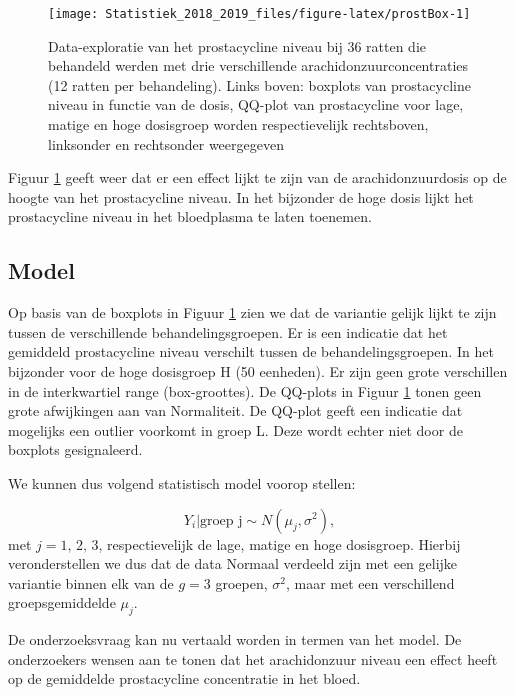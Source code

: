 \documentclass[12pt,dutch,coursenotes]{book}
\theoremstyle{definition}
\theoremstyle{definition}
\theoremstyle{definition}
\theoremstyle{remark}
\begin{document}
\begin{figure}

{\centering \texttt{[image: Statistiek\_2018\_2019\_files/figure-latex/prostBox-1]} 

}

\caption{Data-exploratie van het prostacycline niveau bij 36 ratten die behandeld werden met drie verschillende arachidonzuurconcentraties (12 ratten per behandeling). Links boven: boxplots van prostacycline niveau in functie van de dosis, QQ-plot van prostacycline voor lage, matige en hoge dosisgroep worden respectievelijk rechtsboven, linksonder en rechtsonder weergegeven}\label{fig:prostBox}
\end{figure}

Figuur \ref{fig:prostBox} geeft weer dat er een effect lijkt te zijn van
de arachidonzuurdosis op de hoogte van het prostacycline niveau. In het
bijzonder de hoge dosis lijkt het prostacycline niveau in het
bloedplasma te laten toenemen.

\subsection{Model}\label{model-1}

Op basis van de boxplots in Figuur \ref{fig:prostBox} zien we dat de
variantie gelijk lijkt te zijn tussen de verschillende
behandelingsgroepen. Er is een indicatie dat het gemiddeld prostacycline
niveau verschilt tussen de behandelingsgroepen. In het bijzonder voor de
hoge dosisgroep H (50 eenheden). Er zijn geen grote verschillen in de
interkwartiel range (box-groottes). De QQ-plots in Figuur
\ref{fig:prostBox} tonen geen grote afwijkingen aan van Normaliteit. De
QQ-plot geeft een indicatie dat mogelijks een outlier voorkomt in groep
L. Deze wordt echter niet door de boxplots gesignaleerd.

We kunnen dus volgend statistisch model voorop stellen:

\[Y_i \vert \text{groep j} \sim N(\mu_j,\sigma^2),\] met
\(j= \text{1, 2, 3}\), respectievelijk de lage, matige en hoge
dosisgroep. Hierbij veronderstellen we dus dat de data Normaal verdeeld
zijn met een gelijke variantie binnen elk van de \(g=3\) groepen,
\(\sigma^2\), maar met een verschillend groepsgemiddelde \(\mu_j\).

De onderzoeksvraag kan nu vertaald worden in termen van het model. De
onderzoekers wensen aan te tonen dat het arachidonzuur niveau een effect
heeft op de gemiddelde prostacycline concentratie in het bloed.
\end{document}
